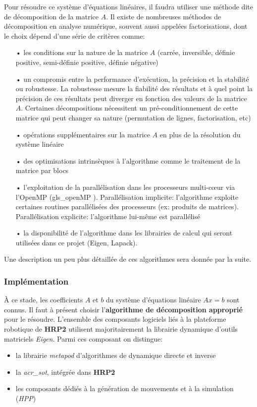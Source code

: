 \documentclass{report}
\begin{document}
Pour résoudre ce système d'équations linéaires, il faudra utiliser une méthode dite de décomposition de la matrice $A$. Il existe de nombreuses méthodes de décomposition en analyse numérique, souvent aussi appelées factorisations, dont le choix dépend d'une série de critères comme:
\begin{itemize}
\item[•] les conditions sur la nature de la matrice $A$ (carrée, inversible, définie positive, semi-définie positive, définie négative)
\item[•] un compromis entre la performance d'exécution, la précision et la stabilité ou robustesse. La robustesse mesure la fiabilité des résultats et à quel point la précision de ces résultats peut diverger en fonction des valeurs de la matrice $A$. Certaines décompositions nécessitent un pré-conditionnement de cette matrice qui peut changer sa nature (permutation de lignes, factorisation, etc)
\item[•] opérations supplémentaires sur la matrice $A$ en plus de la résolution du système linéaire
\item[•] des optimisations intrinsèques à l'algorithme comme le traitement de la matrice par blocs
\item[•] l'exploitation de la parallélisation dans les processeurs multi-cœur via l'OpenMP (\gls{gls_openMP} \cite{bib_openMpWikipedia} \cite{bib_openMPspecs}). Parallélisation implicite: l'algorithme exploite certaines routines parallélisées des processeurs (ex: produits de matrices). Parallélisation explicite: l'algorithme lui-même est parallélisé
\item[•] la disponibilité de l'algorithme dans les librairies de calcul qui seront utilisées dans ce projet (Eigen, Lapack).
\end{itemize}
\medskip
Une description un peu plus détaillée de ces algorithmes sera donnée par  la suite.

\subsubsection{Implémentation}

\`{A} ce stade, les coefficients $A$ et $b$ du système d'équations linéaire $Ax=b$ sont connus. Il faut à présent choisir l'\textbf{algorithme de décomposition approprié} pour le résoudre. L'ensemble des composants logiciels liés à la plateforme robotique de \textbf{HRP2} utilisent majoritairement la librairie dynamique d'outils matriciels \emph{Eigen}. Parmi ces composant on distingue:
\begin{itemize}
\item la librairie \emph{metapod} d'algorithmes de dynamique directe et inverse
\item la \emph{\gls{acr_sot}}, intégrée dans \textbf{HRP2}
\item les composants dédiés à la génération de mouvements et à la simulation (\emph{HPP})
\end{itemize}
\end{document}
